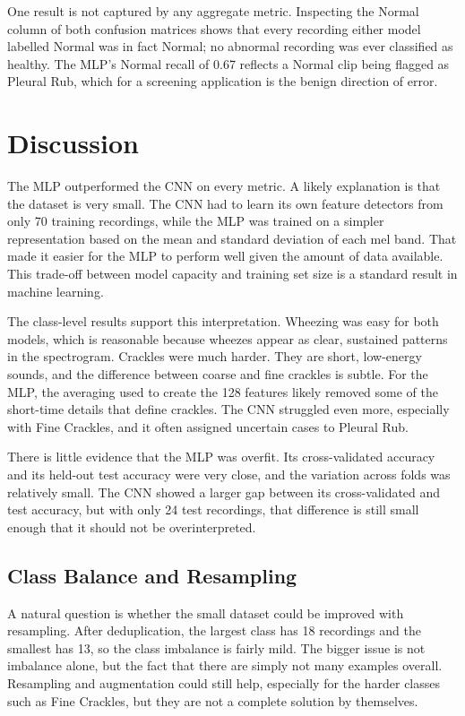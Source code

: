 \documentclass[conference]{IEEEtran}
\begin{document}
One result is not captured by any aggregate metric. Inspecting the Normal column
of both confusion matrices shows that every recording either model labelled
Normal was in fact Normal; no abnormal recording was ever classified as healthy.
The MLP's Normal recall of 0.67 reflects a Normal clip being flagged as Pleural
Rub, which for a screening application is the benign direction of error.

\section{Discussion}
The MLP outperformed the CNN on every metric. A
likely explanation is that the dataset is very small. The CNN had to learn its
own feature detectors from only 70 training recordings, while the MLP was
trained on a simpler representation based on the mean and standard deviation of
each mel band. That made it easier for the MLP to perform well given the amount
of data available. This trade-off between model capacity and training set size
is a standard result in machine learning.

The class-level results support this interpretation. Wheezing was easy for both
models, which is reasonable because wheezes appear as clear, sustained patterns
in the spectrogram. Crackles were much harder. They are short, low-energy
sounds, and the difference between coarse and fine crackles is subtle. For the
MLP, the averaging used to create the 128 features likely removed some of the
short-time details that define crackles. The CNN struggled even more, especially
with Fine Crackles, and it often assigned uncertain cases to Pleural Rub.

There is little evidence that the MLP was overfit. Its cross-validated accuracy
and its held-out test accuracy were very close, and the variation across folds
was relatively small. The CNN showed a larger gap between its cross-validated
and test accuracy, but with only 24 test recordings, that difference is still
small enough that it should not be overinterpreted.

\subsection{Class Balance and Resampling}
\label{sec:resampling}
A natural question is whether the small dataset could be improved with
resampling. After deduplication, the largest class has 18 recordings and the
smallest has 13, so the class imbalance is fairly mild. The bigger issue is not
imbalance alone, but the fact that there are simply not many examples overall.
Resampling and augmentation could still help, especially for the harder classes
such as Fine Crackles, but they are not a complete solution by themselves.
\end{document}

